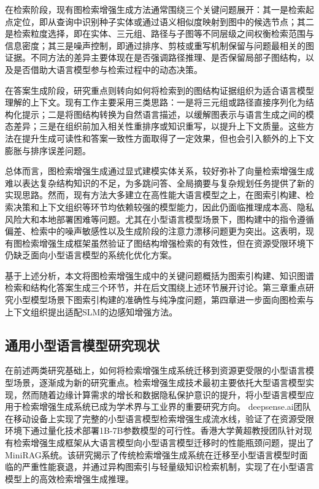 \documentclass[promaster, vlined]{DissertUESTC}
\begin{document}
在检索阶段，现有图检索增强生成方法通常围绕三个关键问题展开：其一是检索起点定位，即从查询中识别种子实体或通过语义相似度映射到图中的候选节点\cite{guo2024lightrag,sanmartin2024kg,wen2024mindmap}；其二是检索粒度选择，即在实体、三元组、路径与子图等不同层级之间权衡检索范围与信息密度\cite{jiang2023structgpt,luo2023reasoning,li2024dalk}；其三是噪声控制，即通过排序、剪枝或重写机制保留与问题最相关的图证据。不同方法的差异主要体现在是否强调路径推理、是否保留局部子图结构，以及是否借助大语言模型参与检索过程中的动态决策。

在答案生成阶段，研究重点则转向如何将检索到的图结构证据组织为适合语言模型理解的上下文。现有工作主要采用三类思路：一是将三元组或路径直接序列化为结构化提示；二是将图结构转换为自然语言描述，以缓解图表示与语言生成之间的模态差异；三是在组织前加入相关性重排序或知识重写，以提升上下文质量\cite{wu2023retrieve,wen2024mindmap,wang2024kicgpt,wu2024cotkr,dai2025large}。这些方法在提升生成可读性和答案一致性方面取得了一定效果，但也会引入额外的上下文膨胀与排序误差问题。

总体而言，图检索增强生成通过显式建模实体关系，较好弥补了向量检索增强生成难以表达复杂结构知识的不足，为多跳问答、全局摘要与复杂规划任务提供了新的实现思路。然而，现有方法大多建立在高性能大语言模型之上，在图索引构建、检索决策和上下文组织等环节均依赖较强的模型能力，因此仍面临推理成本高、隐私风险大和本地部署困难等问题\cite{edge2024local,han2025reasoning}。尤其在小型语言模型场景下，图构建中的指令遵循偏差、检索中的噪声敏感性以及生成阶段的注意力漂移问题更为突出\cite{liu2024lost,bender2021dangers}。这表明，现有图检索增强生成框架虽然验证了图结构增强检索的有效性，但在资源受限环境下仍缺乏面向小型语言模型的系统化优化方案。

基于上述分析，本文将图检索增强生成中的关键问题概括为图索引构建、知识图谱检索和结构化答案生成三个环节，并在后文围绕上述环节展开讨论。第三章重点研究小型模型场景下图索引构建的准确性与纯净度问题，第四章进一步面向图检索与上下文组织提出适配SLM的边感知增强方法。


\subsection{通用小型语言模型研究现状}
在前述两类研究基础上，如何将检索增强生成系统迁移到资源更受限的小型语言模型场景，逐渐成为新的研究重点。检索增强生成技术最初主要依托大型语言模型实现，然而随着边缘计算需求的增长和数据隐私保护意识的提升，将小型语言模型应用于检索增强生成系统已成为学术界与工业界的重要研究方向。
deepsense.ai团队在移动设备上实现了完整的小型语言模型检索增强生成流水线，验证了在资源受限环境下通过量化技术部署1B-7B参数模型的可行性\cite{czerski2024slmrag}。香港大学黄超教授团队针对现有检索增强生成框架从大语言模型向小型语言模型迁移时的性能瓶颈问题，提出了MiniRAG系统\cite{fan2024minirag}。该研究揭示了传统检索增强生成系统在迁移至小型语言模型时面临的严重性能衰退，并通过异构图索引与轻量级知识检索机制，实现了在小型语言模型上的高效检索增强生成推理。
\end{document}
